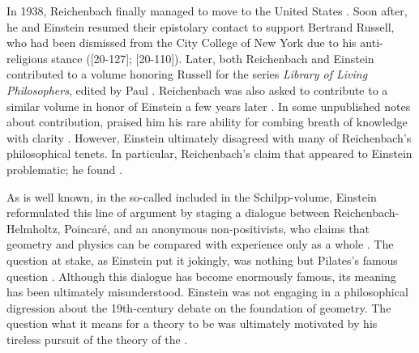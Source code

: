 \documentclass[final]{article}
\begin{document}
In 1938, Reichenbach finally managed to move to the United States \citep{Verhaegh2020a}. Soon after, he and Einstein resumed their epistolary contact to support Bertrand Russell, who had been dismissed from the City College of New York due to his anti-religious stance ([20-127]; [20-110]). Later, both Reichenbach and Einstein contributed to a volume honoring Russell for the series \textit{Library of Living Philosophers}, edited by Paul \citet{Schilpp1944}. Reichenbach was also asked to contribute to a similar volume in honor of Einstein a few years later \citep{Schilpp1949}.  In some unpublished notes about  contribution, \citet{Einstein1949f} praised him his rare ability for combing breath of knowledge with clarity   \citep{Einstein1949f}. However, Einstein ultimately disagreed with many of Reichenbach's philosophical tenets. In particular, Reichenbach's claim that  appeared to Einstein problematic; he found  \citep{Einstein1949f}. 

As is well known, in the so-called  \citep{Einstein1949a} included in the Schilpp-volume, Einstein reformulated this line of argument by staging a dialogue between Reichenbach-Helmholtz, Poincaré, and an anonymous non-positivists, who claims that geometry and physics can be compared with experience only as a whole \citep[676f.]{Einstein1949a}. The question at stake, as Einstein put it jokingly, was nothing but Pilates's famous question  \parencite[John 18:38, quoted in][676]{Einstein1949a}. Although this dialogue has become enormously famous, its meaning has been ultimately misunderstood. Einstein was not engaging in a philosophical digression about the 19th-century debate on the foundation of geometry. The question what it means for a theory to be  was ultimately motivated by his tireless pursuit of the theory of the . 
\end{document}
